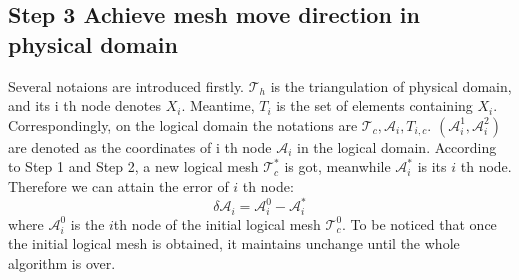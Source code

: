 \documentclass[a4paper, 11pt]{article}
\begin{document}
   \subsection{Step 3 Achieve mesh move direction in physical domain}
      Several notaions are introduced firstly. $\mathcal{T}_h$ is the
      triangulation of physical domain, and its i th node denotes $X_i$. 
      Meantime, $T_i$ is the set of elements containing $X_i$.
      Correspondingly, on the logical domain the notations are
      $\mathcal{T}_c, \mathcal{A}_i, T_{i, c}$. $(\mathcal{A}_i^1,
      \mathcal{A}_i^2)$ are denoted as the coordinates of i th node
      $\mathcal{A}_i$ in the logical domain. According to Step 1 and
      Step 2, a new logical mesh $\mathcal{T}_c^*$ is got, meanwhile
      $\mathcal{A}_i^*$ is its $i$ th node. Therefore we can attain the
      error of $i$ th node:
      \begin{equation}
        \delta \mathcal{A}_i = \mathcal{A}_i^0 - \mathcal{A}_i^*
      \end{equation}
      where $\mathcal{A}_i^0$ is the $i$th node of the initial logical
      mesh $\mathcal{T}_c^0$. To be noticed that once the initial
      logical mesh is obtained, it maintains unchange until the whole
      algorithm is over.
      
\end{document}
